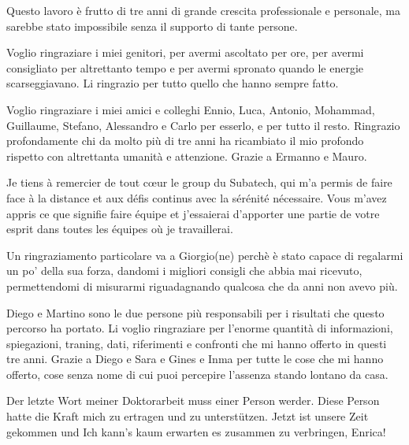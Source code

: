 
\begin{acknowledgements}      


Questo lavoro è frutto di tre anni di grande crescita professionale e personale, ma sarebbe stato impossibile senza il supporto di tante persone.

Voglio ringraziare i miei genitori, per avermi ascoltato per ore, per avermi consigliato per altrettanto tempo e per avermi spronato quando le energie scarseggiavano. Li ringrazio per tutto quello che hanno sempre fatto.

Voglio ringraziare i miei amici e colleghi Ennio, Luca, Antonio, Mohammad, Guillaume, Stefano, Alessandro e Carlo per esserlo, e per tutto il resto.
Ringrazio profondamente chi da molto più di tre anni ha ricambiato il mio profondo rispetto con altrettanta umanità e attenzione. Grazie a Ermanno e Mauro.

Je tiens à remercier de tout cœur le group du Subatech, qui m'a permis de faire face à la distance et aux défis continus avec la sérénité nécessaire.
Vous m'avez appris ce que signifie faire équipe et j'essaierai d'apporter une partie de votre esprit dans toutes les équipes où je travaillerai.

Un ringraziamento particolare va a Giorgio(ne) perchè è stato capace di regalarmi un po' della sua forza, dandomi i migliori consigli che abbia mai ricevuto, permettendomi di misurarmi riguadagnando qualcosa che da anni non avevo più.

Diego e Martino sono le due persone più responsabili per i risultati che questo percorso ha portato. 
Li voglio ringraziare per l'enorme quantità di informazioni, spiegazioni, traning, dati, riferimenti e confronti che mi hanno offerto in questi tre anni.
Grazie a Diego e Sara e Gines e Inma per tutte le cose che mi hanno offerto, cose senza nome di cui puoi percepire l'assenza stando lontano da casa.

Der letzte Wort meiner Doktorarbeit muss einer Person werder.
Diese Person hatte die Kraft mich zu ertragen und zu unterstützen.
Jetzt ist unsere Zeit gekommen und Ich kann's kaum erwarten es zusammen zu verbringen, Enrica!


\end{acknowledgements}
